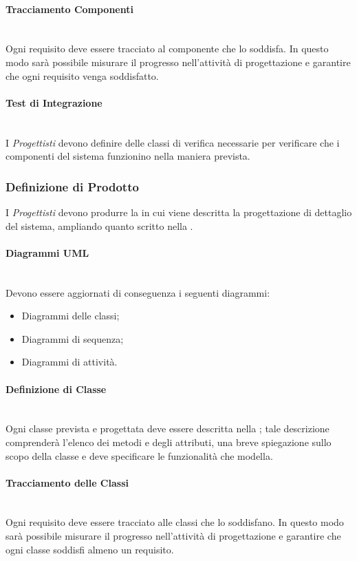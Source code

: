 \paragraph{Tracciamento Componenti}\mbox{}\\
Ogni requisito deve essere tracciato al componente che lo soddisfa. In questo modo sarà possibile misurare il progresso nell'attività di progettazione e garantire che ogni requisito venga soddisfatto.

\paragraph{Test di Integrazione}\mbox{}\\
I \textit{Progettisti} devono definire delle classi di verifica necessarie per verificare che i componenti del sistema funzionino nella maniera prevista.

\subsubsection{Definizione di Prodotto}
I \textit{Progettisti} devono produrre la \DefinizioneDiProdotto{} in cui viene descritta la progettazione di dettaglio del sistema, ampliando quanto scritto nella \SpecificaTecnica{}.

\paragraph{Diagrammi UML}\mbox{}\\
Devono essere aggiornati di conseguenza i seguenti diagrammi:
\begin{itemize}
\item Diagrammi delle classi;
\item Diagrammi di sequenza;
\item Diagrammi di attività.
\end{itemize}

\paragraph{Definizione di Classe}\mbox{}\\
Ogni classe prevista e progettata deve essere descritta nella \DefinizioneDiProdotto{}; tale descrizione comprenderà l'elenco dei metodi e degli attributi, una breve spiegazione sullo scopo della classe e deve specificare le funzionalità che modella.

\paragraph{Tracciamento delle Classi}\mbox{}\\
Ogni requisito deve essere tracciato alle classi che lo soddisfano. In questo modo sarà possibile misurare il progresso nell'attività di progettazione e garantire che ogni classe soddisfi almeno un requisito.

